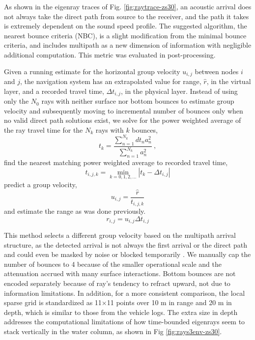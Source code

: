 As shown in the eigenray traces of Fig. \ref{fig:raytrace-zs30}, an acoustic arrival does not always take the direct path from source to the receiver, and the path it takes is extremely dependent on the sound speed profile.
The suggested algorithm, the nearest bounce criteria (NBC), is a slight modification from the minimal bounce criteria, and includes multipath as a new dimension of information with negligible additional computation.
This metric was evaluated in post-processing.

Given a running estimate for the horizontal group velocity $u_{i,j}$ between nodes $i$ and $j$, the navigation system has an extrapolated value for range, $\hat{r}$, in the virtual layer, and a recorded travel time, $\Delta t_{i,j}$, in the physical layer.
Instead of using only the $N_0$ rays with neither surface nor bottom bounces to estimate group velocity and subsequently moving to incremental number of bounces only when no valid direct path solutions exist, we solve for the power weighted average of the ray travel time for the $N_k$ rays with $k$ bounces,
\begin{equation}
t_k = \frac{\sum_{n=1}^{N_{k}} dt_{n}a_{n}^{2}}{\sum_{n=1}^{N_{k}} a_{n}^{2}} ~, 
\end{equation}
find the nearest matching power weighted average to recorded travel time,
\begin{equation}
t_{i,j,k} = \min_{k=0,1,2,...} \left| t_k - \Delta t_{i,j} \right|
\end{equation}
predict a group velocity,
\begin{equation}
u_{i,j} = \dfrac{\hat{r}}{t_{i,j,k}}
\end{equation}
and estimate the range as was done previously.
\begin{equation}
r_{i,j} = u_{i,j}\Delta t_{i,j}
\end{equation}

This method selects a different group velocity based on the multipath arrival structure, as the detected arrival is not always the first arrival or the direct path and could even be masked by noise or blocked temporarily \citep{deffenbaugh_acoustic_1996}.
We manually cap the number of bounces to 4 because of the smaller operational scale and the attenuation accrued with many surface interactions.
Bottom bounces are not encoded separately because of ray's tendency to refract upward, not due to information limitations. 
In addition, for a more consistent comparison, the local sparse grid is standardized as 11$\times$11 points over 10 m in range and 20 m in depth, which is similar to those from the vehicle logs.
The extra size in depth addresses the computational limitations of how time-bounded eigenrays seem to stack vertically in the water column, as shown in Fig \ref{fig:rays3env-zs30}.

